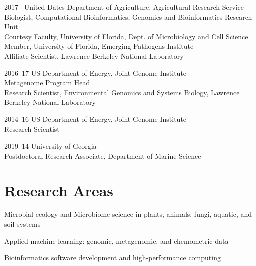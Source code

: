 \documentclass[12pt,letterpaper]{report}
\newcommand{\listitemspace}{0.15em}
\renewenvironment{itemize}
{\begin{list}{}{\setlength{\leftmargin}{0em}
            \setlength{\parskip}{0em}
            \setlength{\itemsep}{\listitemspace}
            \setlength{\parsep}{\listitemspace}}}
    {\end{list}}
\begin{document}
    \begin{tablist}

        \item[2017--]   \tab United Dates Department of Agriculture, Agricultural Research Service \\
                             Biologist, Computational Bioinformatics, Genomics and Bioinformatics Research Unit\\
                             \tab Courtesy Faculty, University of Florida, Dept. of Microbiology and Cell Science\\
                              \tab  Member, University of Florida, Emerging Pathogens Institute\\
                             \tab Affiliate Scientist, Lawrence Berkeley National Laboratory
                            

        \item[2016--17] \tab US Department of Energy, Joint Genome Institute \\
                             Metagenome Program Head \\
                             Research Scientist, Environmental Genomics and Systems Biology, Lawrence Berkeley National Laboratory \\
                             
        \item[2014--16] \tab US Department of Energy, Joint Genome Institute \\
                             Research Scientist  \\

        \item[2019--14] \tab University of Georgia \\
                             Postdoctoral Research Associate, Department of Marine Science
                             
		  

    \end{tablist}

    \section*{Research Areas}

    \begin{itemize}

        \item Microbial ecology and Microbiome science in plants, animals, fungi, aquatic, and soil systems

        \item Applied machine learning: genomic, metagenomic, and chemometric data 

        \item Bioinformatics software development and high-performance computing

    \end{itemize}
\end{document}
